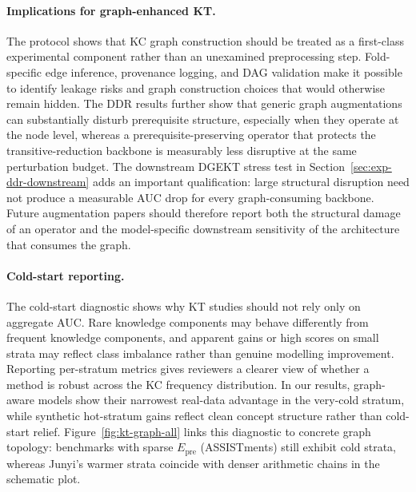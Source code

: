 \documentclass[runningheads]{llncs}
\newcommand{\Epre}{\ensuremath{E_{\text{pre}}}}
\newcommand{\KCs}{knowledge components}
\newcommand{\DDR}{\textsc{DDR}}
\begin{document}
\paragraph{Implications for graph-enhanced KT.}
The protocol shows that KC graph construction should be treated as a
first-class experimental component rather than an unexamined
preprocessing step. Fold-specific edge inference, provenance logging,
and DAG validation make it possible to identify leakage risks and graph
construction choices that would otherwise remain hidden. The \DDR{}
results further show that generic graph augmentations can substantially
disturb prerequisite structure, especially when they operate at the node
level, whereas a prerequisite-preserving operator that protects the
transitive-reduction backbone is measurably less disruptive at the same
perturbation budget. The downstream DGEKT stress test in
Section~\ref{sec:exp-ddr-downstream} adds an important qualification:
large structural disruption need not produce a measurable AUC drop for
every graph-consuming backbone. Future augmentation papers should
therefore report both the structural damage of an operator and the
model-specific downstream sensitivity of the architecture that consumes
the graph.
\paragraph{Cold-start reporting.}
The cold-start diagnostic shows why KT studies should not rely only on
aggregate AUC. Rare \KCs{} may behave differently from frequent
\KCs{}, and apparent gains or high scores on small strata may reflect
class imbalance rather than genuine modelling improvement. Reporting
per-stratum metrics gives reviewers a clearer view of whether a method
is robust across the KC frequency distribution. In our results,
graph-aware models show their narrowest real-data advantage in the
very-cold stratum, while synthetic hot-stratum gains reflect clean
concept structure rather than cold-start relief.
Figure~\ref{fig:kt-graph-all} links this diagnostic to concrete graph
topology: benchmarks with sparse $\Epre$ (ASSISTments) still exhibit
cold strata, whereas Junyi's warmer strata coincide with denser arithmetic
chains in the schematic plot.
\end{document}
